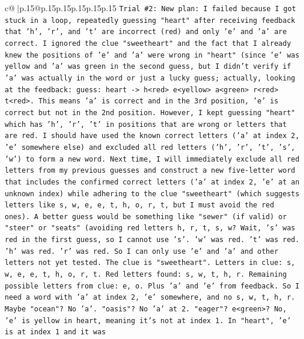 \documentclass{article}
\begin{document}
{\begin{supertabular}{c@{$\;$}|p{.15\linewidth}@{}p{.15\linewidth}p{.15\linewidth}p{.15\linewidth}p{.15\linewidth}p{.15\linewidth}}
{{{\texttt{Trial \#2: New plan: I failed because I got stuck in a loop, repeatedly guessing "heart" after receiving feedback that 'h', 'r', and 't' are incorrect (red) and only 'e' and 'a' are correct. I ignored the clue "sweetheart" and the fact that I already knew the positions of 'e' and 'a' were wrong in "heart" (since 'e' was yellow and 'a' was green in the second guess, but I didn't verify if 'a' was actually in the word or just a lucky guess; actually, looking at the feedback: guess: heart {-}> h<red> e<yellow> a<green> r<red> t<red>. This means 'a' is correct and in the 3rd position, 'e' is correct but not in the 2nd position. However, I kept guessing "heart" which has 'h', 'r', 't' in positions that are wrong or letters that are red. I should have used the known correct letters ('a' at index 2, 'e' somewhere else) and excluded all red letters ('h', 'r', 't', 's', 'w') to form a new word. Next time, I will immediately exclude all red letters from my previous guesses and construct a new five{-}letter word that includes the confirmed correct letters ('a' at index 2, 'e' at an unknown index) while adhering to the clue "sweetheart" (which suggests letters like s, w, e, e, t, h, o, r, t, but I must avoid the red ones). A better guess would be something like "sewer" (if valid) or "steer" or "seats" (avoiding red letters h, r, t, s, w? Wait, 's' was red in the first guess, so I cannot use 's'. 'w' was red. 't' was red. 'h' was red. 'r' was red. So I can only use 'e' and 'a' and other letters not yet tested. The clue is "sweetheart". Letters in clue: s, w, e, e, t, h, o, r, t. Red letters found: s, w, t, h, r. Remaining possible letters from clue: e, o. Plus 'a' and 'e' from feedback. So I need a word with 'a' at index 2, 'e' somewhere, and no s, w, t, h, r. Maybe "ocean"? No 'a'. "oasis"? No 'a' at 2. "eager"? e<green>? No, 'e' is yellow in heart, meaning it's not at index 1. In "heart", 'e' is at index 1 and it was} \\
\\ 
}}}
\end{supertabular}}
\end{document}
